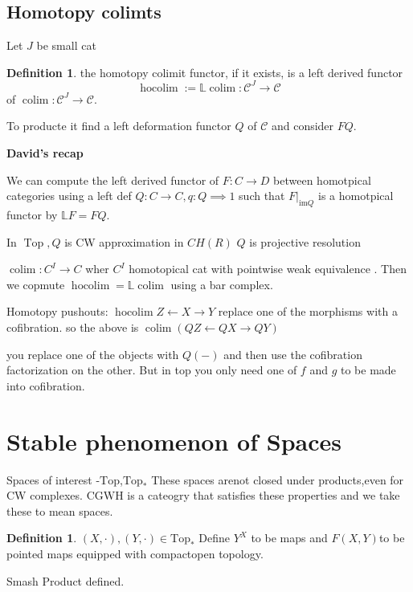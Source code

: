 \documentclass[notitlepage, 12pt]{article}
\theoremstyle{definition}
\newtheorem{definition}[theorem]{Definition}
\theoremstyle{para}
\begin{document}
\subsection{Homotopy colimts}
Let $J$ be small cat 
\begin{definition}
    the homotopy colimit functor, if it exists, is a left derived functor 
    \[
         \operatorname{hocolim}:=\mathbb{L}\operatorname{colim} : \mathcal{C}^J \to \mathcal{C}
    \] of $\operatorname{colim} :\mathcal{C}^J\to \mathcal{C}$. 

    To producte it find a left deformation functor $Q$ of $\mathcal{C}$ and consider $FQ$. 
\end{definition}

{\bf David's recap}

We can compute the left derived functor of $F: C\to D$ between homotpical categories using a left def $Q: C\to C, q: Q\implies 1$ such that $F\vert_{\mathrm{im}  Q}$ is a homotpical functor by $\mathbb{L}F=FQ$. 

In $\mathop{\mathrm{Top }}, Q$ is CW approximation 
in $CH(R)$ $Q$ is projective resolution 

$\mathop{\mathrm{ colim }}: C^I \to C$ wher $C^I$ homotopical cat with pointwise weak equivalence . Then we copmute $\mathop{\mathrm{hocolim }}=\mathbb{L}\mathop{\mathrm{ colim }}$ using a bar complex. 

Homotopy pushouts: $\mathop{\mathrm{ hocolim}} Z\leftarrow X\to Y$ replace one of the morphisms with a cofibration. so the above is $\mathop{\mathrm{colim }}(QZ\leftarrow QX \to QY)$

you replace one of the objects with $Q(-)$ and then use the cofibration factorization on the other. But in top you only need one of $f$ and $g$ to be made into cofibration.   

\section{Stable phenomenon of Spaces }
Spaces of interest -$\mathrm{Top} $,$\mathrm{Top_{\ast}}$ 
These spaces arenot closed under products,even for CW complexes. $\mathrm{ CGWH } $ is a cateogry that satisfies these properties and we take these to mean spaces. 

\begin{definition}
  $(X,\cdot),(Y,\cdot)\in \mathrm{Top_{\ast }} $ Define $Y^X$ to be maps and $F(X,Y)$to be pointed maps equipped with compactopen topology. 

  Smash Product defined. 
\end{definition}
\end{document}
